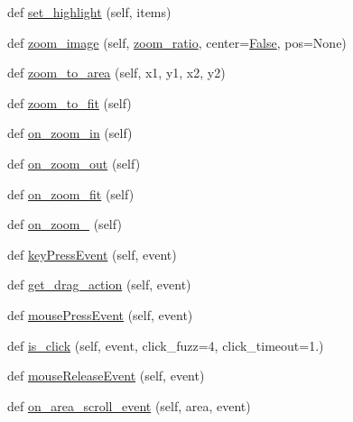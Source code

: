\begin{DoxyCompactItemize}
\item 
def \hyperlink{namespacesmacc__viewer_1_1xdot_1_1xdot__qt_a92e10589a63f3a93ab3d6c5e38ea1210}{set\+\_\+highlight} (self, items)
\item 
def \hyperlink{namespacesmacc__viewer_1_1xdot_1_1xdot__qt_a36971852468c137ec10db319dfc02ea7}{zoom\+\_\+image} (self, \hyperlink{namespacesmacc__viewer_1_1xdot_1_1xdot__qt_ab0b18c2a0f7367089860915decf159a1}{zoom\+\_\+ratio}, center=\hyperlink{namespacesmacc__viewer_a5928e8da279785cbab9011356c3eaa87}{False}, pos=None)
\item 
def \hyperlink{namespacesmacc__viewer_1_1xdot_1_1xdot__qt_af599c8a8db9ed53f9afe5335fdc0c4d0}{zoom\+\_\+to\+\_\+area} (self, x1, y1, x2, y2)
\item 
def \hyperlink{namespacesmacc__viewer_1_1xdot_1_1xdot__qt_a4c0fdbb374d17955a6ee853c44752e95}{zoom\+\_\+to\+\_\+fit} (self)
\item 
def \hyperlink{namespacesmacc__viewer_1_1xdot_1_1xdot__qt_aadce73eb60a04a240757ad27e6fec914}{on\+\_\+zoom\+\_\+in} (self)
\item 
def \hyperlink{namespacesmacc__viewer_1_1xdot_1_1xdot__qt_a33e6df0e691ad246335381d23ea02c8a}{on\+\_\+zoom\+\_\+out} (self)
\item 
def \hyperlink{namespacesmacc__viewer_1_1xdot_1_1xdot__qt_a46e56f342811d84b5d195a099aebb029}{on\+\_\+zoom\+\_\+fit} (self)
\item 
def \hyperlink{namespacesmacc__viewer_1_1xdot_1_1xdot__qt_a1be0dcc3d3b1af9f39f8810778104799}{on\+\_\+zoom\+\_} (self)
\item 
def \hyperlink{namespacesmacc__viewer_1_1xdot_1_1xdot__qt_a7edb0d2c26f36159d820fccc6aa33213}{key\+Press\+Event} (self, event)
\item 
def \hyperlink{namespacesmacc__viewer_1_1xdot_1_1xdot__qt_ae30d1324fac70cbfacea7f5418068cd1}{get\+\_\+drag\+\_\+action} (self, event)
\item 
def \hyperlink{namespacesmacc__viewer_1_1xdot_1_1xdot__qt_a034380cc702f49bcadd558bf9c3e5d76}{mouse\+Press\+Event} (self, event)
\item 
def \hyperlink{namespacesmacc__viewer_1_1xdot_1_1xdot__qt_ade9270ff65a607890a983a618564aee9}{is\+\_\+click} (self, event, click\+\_\+fuzz=4, click\+\_\+timeout=1.)
\item 
def \hyperlink{namespacesmacc__viewer_1_1xdot_1_1xdot__qt_a75da0a63e3a1afbe18b1ffae4efa71c4}{mouse\+Release\+Event} (self, event)
\item 
def \hyperlink{namespacesmacc__viewer_1_1xdot_1_1xdot__qt_a95a6b6c5636c8133203088e66552ea63}{on\+\_\+area\+\_\+scroll\+\_\+event} (self, area, event)

\end{DoxyCompactItemize}
